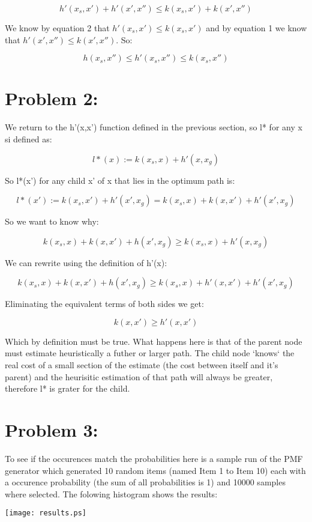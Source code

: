 \documentclass{article}
\begin{document}
\[ h'(x_s,x') + h'(x',x'') \leq k(x_s,x') + k(x',x'') \]

We know by equation 2 that $h'(x_s,x') \leq k(x_s,x')$ and by equation 1 we know that $h'(x',x'') \leq k(x',x'')$. So:

\begin{equation}
  h(x_s,x'') \leq h'(x_s,x'') \leq k(x_s,x'')
\end{equation}

\section{Problem 2:}

We return to the h'(x,x') function defined in the previous section, so l* for any x si defined as:

\[ l*(x):=k(x_s,x)+h'(x,x_g) \]

So l*(x') for any child x' of x that lies in the optimum path is:

\[ l*(x'):=k(x_s,x')+h'(x',x_g)=k(x_s,x)+k(x,x')+h'(x',x_g) \]

So we want to know why:

\[k(x_s,x)+k(x,x')+h(x',x_g) \ge k(x_s,x)+h'(x,x_g) \]

We can rewrite using the definition of h'(x):

\[k(x_s,x)+k(x,x')+h(x',x_g) \ge k(x_s,x)+h'(x,x')+h'(x',x_g) \]

Eliminating the equivalent terms of both sides we get:

\[k(x,x') \ge h'(x,x') \]

Which by definition must be true. What happens here is that of the parent node must estimate heuristically a futher or larger path. The child node `knows` the real cost of a small section of the estimate (the cost between itself and it's parent) and the heurisitic estimation of that path will always be greater, therefore l* is grater for the child.

\section{Problem 3:}

To see if the occurences match the probabilities here is a sample run of the PMF generator which generated 10 random items (named Item 1 to Item 10) each with a occurence probability (the sum of all probabilities is 1) and 10000 samples where selected. The folowing histogram shows the results:

\texttt{[image: results.ps]}
\end{document}
